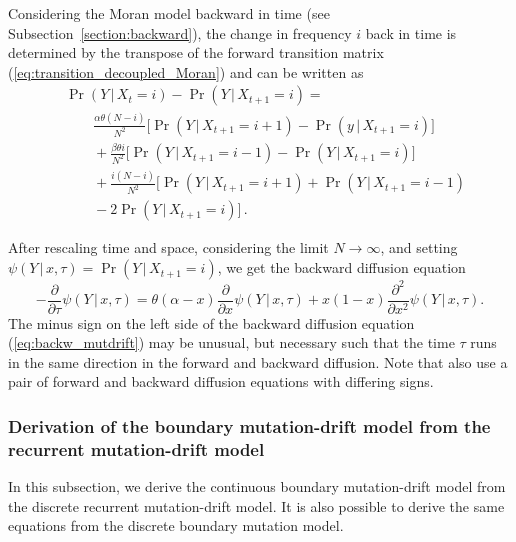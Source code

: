 \documentclass[preprint]{elsarticle}
\newcommand\given{{\,|\,}}
\newcommand\x[1]{\ensuremath{X_{#1}}}
\newcommand\y{\ensuremath{Y}}
\begin{document}
Considering the Moran model backward in time (see Subsection~\ref{section:backward}), the change in frequency $i$ back in time is determined by the transpose of the forward transition matrix (\ref{eq:transition_decoupled_Moran}) and can be written as
\begin{equation}\label{eq:back_discr_mutation}
\begin{split}
&\Pr(\y \given\x{t}=i)-\Pr(\y\given\x{t+1}=i) = \\
&\qquad \frac{\alpha \theta (N-i)}{N^2} \bigg[\Pr(\y\given\x{t+1}=i+1)-\Pr(y\given\x{t+1}=i)\bigg]\\
&\qquad+ \frac{\beta \theta i}{N^2} \bigg[\Pr(\y\given\x{t+1}=i-1)-\Pr(\y\given\x{t+1}=i)\bigg]\\
&\qquad+ \frac{i(N-i)}{N^2} \bigg[\Pr(\y\given\x{t+1}=i+1)+\Pr(\y\given\x{t+1}=i-1)\\
&\qquad-2\Pr(\y\given\x{t+1}=i)\bigg]\,.
\end{split}
\end{equation}

After rescaling time and space, considering the limit $N \to \infty$, and setting $\psi(\y\given x,\tau)=\Pr(\y\given \x{t+1}=i)$, we get the backward diffusion equation
\begin{equation}\label{eq:backw_mutdrift}
-\frac{\partial}{\partial \tau} \psi(\y\given x,\tau) =
    \theta(\alpha-x)\frac{\partial}{\partial x} \psi(\y\given x,\tau) +x(1-x)\frac{\partial^2}{\partial x^2}\psi(\y\given x,\tau).
\end{equation}
The minus sign on the left side of the backward diffusion equation (\ref{eq:backw_mutdrift}) may be unusual, but necessary such that the time $\tau$ runs in the same direction in the forward and backward diffusion. Note that \citet{Zhao13a} also use a pair of forward and backward diffusion equations with differing signs.


\subsubsection{Derivation of the boundary mutation-drift model from the recurrent mutation-drift model}\label{section:backward_derivation}

In this subsection, we derive the continuous boundary mutation-drift model from the discrete recurrent mutation-drift model. It is also possible to derive the same equations from the discrete boundary mutation model.
\end{document}

